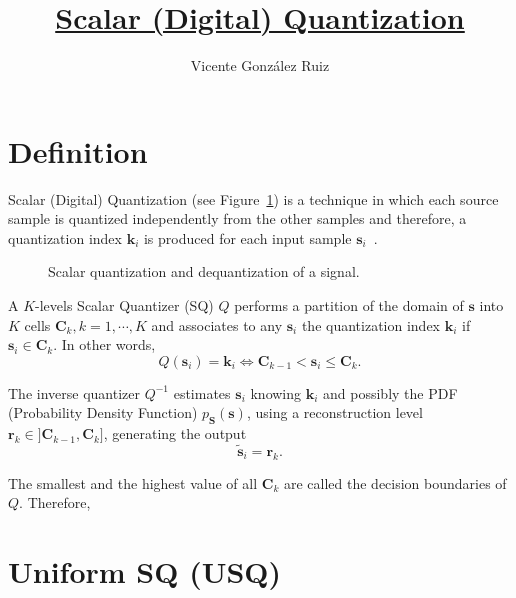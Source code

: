 
\title{\href{https://github.com/vicente-gonzalez-ruiz/scalar_quantization}{Scalar (Digital) Quantization}}

\author{Vicente González Ruiz}

\maketitle
\tableofcontents

\section{Definition}

Scalar (Digital) Quantization (see Figure~\ref{fig:Q}) is a
technique in which each source sample is quantized independently from
the other samples and therefore, a quantization index ${\mathbf k}_i$
is produced for each input sample ${\mathbf
  s}_i$~\cite{vruiz__signal_quantization}.

\begin{figure}
  \caption{Scalar quantization and dequantization of a signal.}
  \label{fig:Q}
\end{figure}

A $K$-levels Scalar Quantizer (SQ) $Q$ performs a partition of the
domain of ${\mathbf s}$ into $K$ cells ${\mathbf C}_k, k = 1, \cdots,
K$ and associates to any ${\mathbf s}_i$ the quantization index ${\mathbf k}_i$ if
${\mathbf s}_i\in {\mathbf C}_k$. In other words,
\begin{equation}
  Q({\mathbf s}_i) = {\mathbf k}_i \Leftrightarrow {\mathbf C}_{k-1} <
  {\mathbf s}_i \le {\mathbf C}_k.
\end{equation}

The inverse quantizer $Q^{-1}$ estimates ${\mathbf s}_i$ knowing
${\mathbf k}_i$ and possibly the PDF (Probability Density Function)
$p_{\mathbf S}({\mathbf s})$, using a reconstruction level ${\mathbf
  r}_k\in ]{\mathbf C}_{k-1}, {\mathbf C}_k]$, generating the output
\begin{equation}
  \tilde{\mathbf s}_i = {\mathbf r}_k.
\end{equation}

The smallest and the highest value of all ${\mathbf C}_k$ are called
the decision boundaries of $Q$. Therefore,


\section{Uniform SQ (USQ)}

